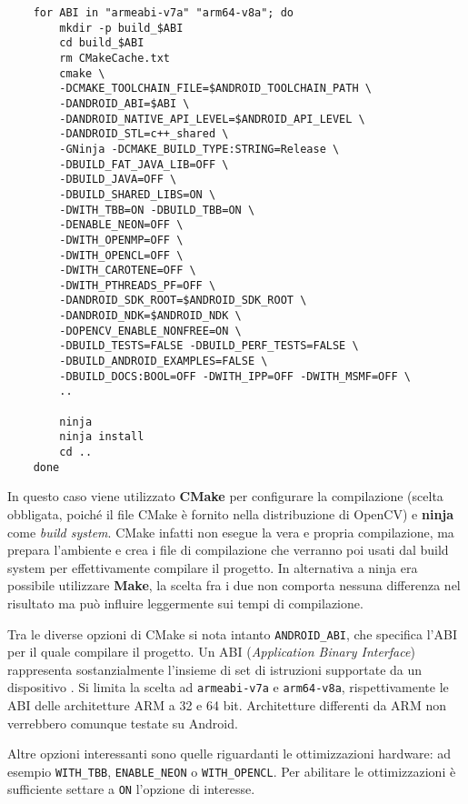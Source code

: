 
\begin{verbatim}
    for ABI in "armeabi-v7a" "arm64-v8a"; do
        mkdir -p build_$ABI
        cd build_$ABI
        rm CMakeCache.txt
        cmake \
        -DCMAKE_TOOLCHAIN_FILE=$ANDROID_TOOLCHAIN_PATH \
        -DANDROID_ABI=$ABI \
        -DANDROID_NATIVE_API_LEVEL=$ANDROID_API_LEVEL \
        -DANDROID_STL=c++_shared \
        -GNinja -DCMAKE_BUILD_TYPE:STRING=Release \
        -DBUILD_FAT_JAVA_LIB=OFF \
        -DBUILD_JAVA=OFF \
        -DBUILD_SHARED_LIBS=ON \
        -DWITH_TBB=ON -DBUILD_TBB=ON \
        -DENABLE_NEON=OFF \
        -DWITH_OPENMP=OFF \
        -DWITH_OPENCL=OFF \
        -DWITH_CAROTENE=OFF \
        -DWITH_PTHREADS_PF=OFF \
        -DANDROID_SDK_ROOT=$ANDROID_SDK_ROOT \
        -DANDROID_NDK=$ANDROID_NDK \
        -DOPENCV_ENABLE_NONFREE=ON \
        -DBUILD_TESTS=FALSE -DBUILD_PERF_TESTS=FALSE \
        -DBUILD_ANDROID_EXAMPLES=FALSE \
        -DBUILD_DOCS:BOOL=OFF -DWITH_IPP=OFF -DWITH_MSMF=OFF \
        ..
    
        ninja
        ninja install
        cd ..
    done
\end{verbatim}

In questo caso viene utilizzato \textbf{CMake} per configurare la compilazione (scelta obbligata, poiché il file CMake è fornito 
nella distribuzione di OpenCV) e \textbf{ninja} come \textit{build system}. 
CMake infatti non esegue la vera e propria compilazione, ma prepara l'ambiente e crea i file di compilazione che 
verranno poi usati dal build system per effettivamente compilare il progetto. In alternativa a ninja era possibile 
utilizzare \textbf{Make}, la scelta fra i due non comporta nessuna differenza nel risultato ma può influire leggermente 
sui tempi di compilazione.

Tra le diverse opzioni di CMake si nota intanto \texttt{ANDROID\_ABI}, che specifica l'ABI per il quale compilare il
progetto. Un ABI (\textit{Application Binary Interface}) rappresenta sostanzialmente l'insieme di set di istruzioni
supportate da un dispositivo \cite{adev_abi}. Si limita la scelta ad \texttt{armeabi-v7a} e \texttt{arm64-v8a}, rispettivamente 
le ABI delle architetture ARM a 32 e 64 bit. Architetture differenti da ARM non verrebbero comunque testate su Android.

Altre opzioni interessanti sono quelle riguardanti le ottimizzazioni hardware: ad esempio \texttt{WITH\_TBB}, 
\texttt{ENABLE\_NEON} o \texttt{WITH\_OPENCL}. Per abilitare le ottimizzazioni è sufficiente settare a \texttt{ON}
l'opzione di interesse.

